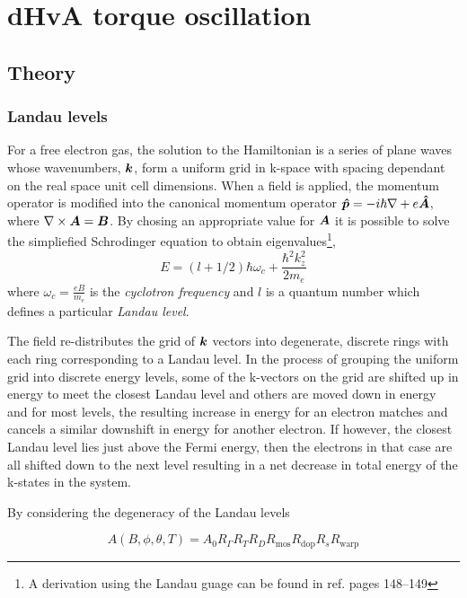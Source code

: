 
\section{dHvA torque oscillation}

\subsection{Theory}

\subsubsection{Landau levels}

For a free electron gas, the solution to the Hamiltonian is a series of plane waves whose wavenumbers, $\boldsymbol{k}$, form a uniform grid in k-space with spacing dependant on the real space unit cell dimensions. When a field is applied, the momentum operator is modified into the canonical momentum operator $\boldsymbol{\hat{p}} = -i\hbar\nabla + e\boldsymbol{\hat{A}}$, where $\nabla \times \boldsymbol{A} = \boldsymbol{B}$. By chosing an appropriate value for $\boldsymbol{A}$ it is possible to solve the simpliefied Schr\:odinger equation to obtain eigenvalues\footnote{A derivation using the Landau guage can be found in ref. \cite{Blundell2001} pages 148--149},
$$E=(l+1/2)\hbar\omega_c + \frac{\hbar^2 k^2_z}{2m_e}$$
where $\omega_c = \frac{eB}{m_e}$ is the \textit{cyclotron frequency} and $l$ is a quantum number which defines a particular \textit{Landau level}.

The field re-distributes the grid of $\boldsymbol{k}$ vectors into degenerate, discrete rings with each ring corresponding to a Landau level. In the process of grouping the uniform grid into discrete energy levels, some of the k-vectors on the grid are shifted up in energy to meet the closest Landau level and others are moved down in energy and for most levels, the resulting increase in energy for an electron matches and cancels a similar downshift in energy for another electron. If however, the closest Landau level lies just above the Fermi energy, then the electrons in that case are all shifted down to the next level resulting in a net decrease in total energy of the k-states in the system.

By considering the degeneracy of the Landau levels





\begin{equation}
A(B,\phi,\theta,T)=A_0R_{\Gamma}R_TR_DR_{\textrm{mos}}R_{\textrm{dop}}R_sR_{\textrm{warp}}
\label{Eqn:2:OscilllationAmp}
\end{equation}

